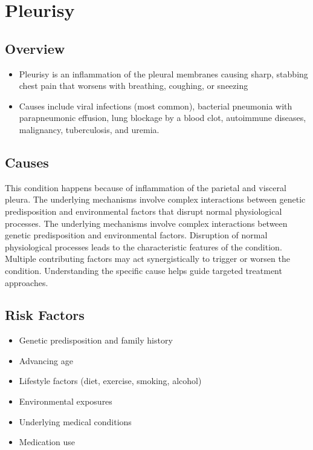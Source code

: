 \chapter{Pleurisy}
\label{sec:Pleurisy}

\section{Overview}


\begin{itemize}[noitemsep]
  \item Pleurisy is an inflammation of the pleural membranes causing sharp, stabbing chest pain that worsens with breathing, coughing, or sneezing
  \item Causes include viral infections (most common), bacterial pneumonia with parapneumonic effusion, lung blockage by a blood clot, autoimmune diseases, malignancy, tuberculosis, and uremia.
\end{itemize}
\section{Causes}
This condition happens because of inflammation of the parietal and visceral pleura. The underlying mechanisms involve complex interactions between genetic predisposition and environmental factors that disrupt normal physiological processes. The underlying mechanisms involve complex interactions between genetic predisposition and environmental factors. Disruption of normal physiological processes leads to the characteristic features of the condition. Multiple contributing factors may act synergistically to trigger or worsen the condition. Understanding the specific cause helps guide targeted treatment approaches.
\section{Risk Factors}


\begin{itemize}[noitemsep]
  \item Genetic predisposition and family history
  \item Advancing age
  \item Lifestyle factors (diet, exercise, smoking, alcohol)
  \item Environmental exposures
  \item Underlying medical conditions
  \item Medication use
\end{itemize}
